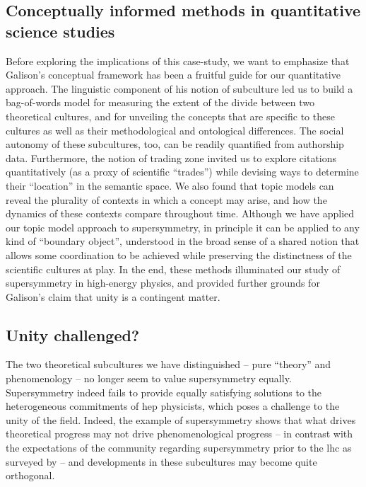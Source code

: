 \documentclass[smallextended]{svjour3}
\begin{document}
\subsection{Conceptually informed methods in quantitative science studies}

Before exploring the implications of this case-study, we want to emphasize that Galison's conceptual framework has been a fruitful guide for our quantitative approach. The linguistic component of his notion of subculture led us to build a bag-of-words model for measuring the extent of the divide between two theoretical cultures, and for unveiling the concepts that are specific to these cultures as well as their methodological and ontological differences. The social autonomy of these subcultures, too, can be readily quantified from authorship data. Furthermore, the notion of trading zone invited us to explore citations quantitatively (as a proxy of scientific ``trades'') while devising ways to determine their ``location'' in the semantic space. We also found that topic models can reveal the plurality of contexts in which a concept may arise, and how the dynamics of these contexts compare throughout time. Although we have applied our topic model approach to supersymmetry, in principle it can be applied to any kind of ``boundary object'', understood in the broad sense of a shared notion that allows some coordination to be achieved while preserving the distinctness of the scientific cultures at play. In the end, these methods illuminated our study of supersymmetry in high-energy physics, and provided further grounds for Galison's claim that unity is a contingent matter. 


\subsection{Unity challenged?}

  

The two theoretical subcultures we have distinguished -- pure ``theory'' and phenomenology -- no longer seem to value supersymmetry equally. Supersymmetry indeed fails to provide equally satisfying solutions to the heterogeneous commitments of \gls{hep} physicists, which poses a challenge to the unity of the field. Indeed, the example of supersymmetry shows that what drives theoretical progress may not drive phenomenological progress -- in contrast with the expectations of the community regarding supersymmetry prior to the \gls{lhc} as surveyed by \citealt{Mttig2019,Mttig2020a} -- and developments in these subcultures may become quite orthogonal.
\end{document}
